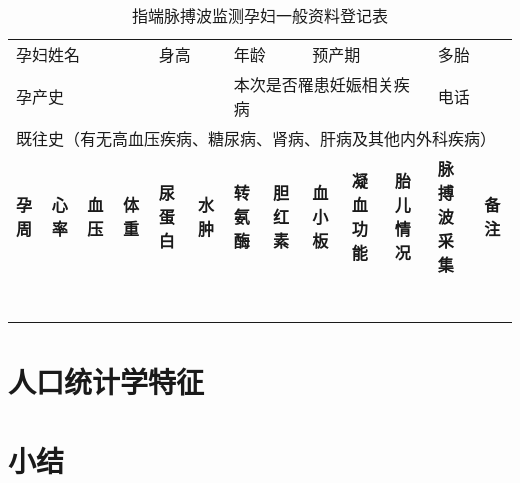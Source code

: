 \begin{table}[htbp]
      \centering
      \fontsize{8}{4}
      \caption{指端脉搏波监测孕妇一般资料登记表}
      \label{tab:addlabel}%
      \begin{tabularx}{\linewidth}{X<{\centering}X<{\centering}X<{\centering}X<{\centering}X<{\centering}
            X<{\centering}X<{\centering}X<{\centering}X<{\centering}X<{\centering}X<{\centering}X<{\centering}X<{\centering}}
      \multicolumn{4}{l}{孕妇姓名} & \multicolumn{2}{l}{身高} & \multicolumn{2}{l}{年龄} & \multicolumn{3}{l}{预产期} & \multicolumn{2}{l}{多胎}\\
      \multicolumn{6}{l}{孕产史}   & \multicolumn{5}{l}{本次是否罹患妊娠相关疾病}  & \multicolumn{2}{l}{电话}  \\
      \multicolumn{13}{l}{既往史（有无高血压疾病、糖尿病、肾病、肝病及其他内外科疾病）}  \\
      \toprule
      \multicolumn{1}{l}{\textbf{孕周}} & \multicolumn{1}{l}{\textbf{心率}} & \multicolumn{1}{l}{\textbf{血压}} & \multicolumn{1}{l}{\textbf{体重}} & \multicolumn{1}{l}{\textbf{尿蛋白}} & 
      \multicolumn{1}{l}{\textbf{水肿}} & \multicolumn{1}{l}{\textbf{转氨酶}} & \multicolumn{1}{l}{\textbf{胆红素}} & \multicolumn{1}{l}{\textbf{血小板}} & \multicolumn{1}{l}{\textbf{凝血功能}} & 
      \multicolumn{1}{l}{\textbf{胎儿情况}} & \multicolumn{1}{l}{\textbf{脉搏波采集}} & \multicolumn{1}{l}{\textbf{备注}} \\
      \bottomrule
      &       &       &       &       &       &       &       &       &       &       &       &  \\
      
      &       &       &       &       &       &       &       &       &       &       &       &  \\
      
      &       &       &       &       &       &       &       &       &       &       &       &  \\
      
      &       &       &       &       &       &       &       &       &       &       &       &  \\
      
      &       &       &       &       &       &       &       &       &       &       &       &  \\
      
      &       &       &       &       &       &       &       &       &       &       &       &  \\
      
      &       &       &       &       &       &       &       &       &       &       &       &  \\
      \bottomrule
      \end{tabularx}%
\end{table}%
\section{人口统计学特征}
\section{小结}